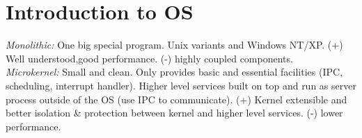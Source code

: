 \section{Introduction to OS}
\emph{Monolithic:} One big special program. Unix variants and Windows NT/XP. (+) Well understood,good performance. (-) highly coupled components.\\
\emph{Microkernel:} Small and clean. Only provides basic and essential facilities (IPC, scheduling, interrupt handler). Higher level services built on top and run as server process outside of the OS (use IPC to communicate). (+) Kernel extensible and better isolation \& protection between kernel and higher level services. (-) lower performance.